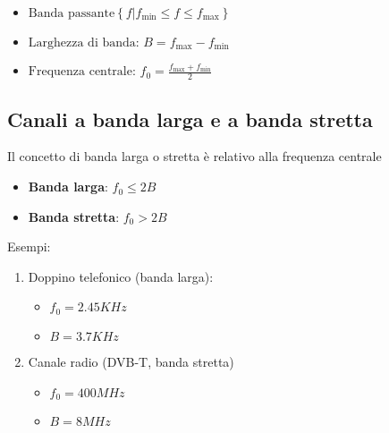 \begin{enumerate}
\begin{center}
          \end{center}

\end{enumerate}
\begin{itemize}
    \item $\text{Banda passante} \left\{ f \vert f_{\text{min}} \leq f \leq f_{\text{max}} \right\}$
    \item $\text{Larghezza di banda: } B = f_{\text{max}} - f_{\text{min}} $
    \item $\text{Frequenza centrale: } f_0 = \frac{f_{\text{max}} + f_{\text{min}}}{2}$
\end{itemize}



\subsection*{Canali a banda larga e a banda stretta}
Il concetto di banda larga o stretta è relativo alla frequenza centrale
\begin{itemize}
    \item \textbf{Banda larga}: $f_0 \leq 2B$
    \item \textbf{Banda stretta}: $f_0 > 2B$
\end{itemize}


Esempi:
\begin{enumerate}
    \item Doppino telefonico (banda larga):
          \begin{itemize}
              \item $f_0 = 2.45 KHz$
              \item $B = 3.7 KHz$
          \end{itemize}
    \item Canale radio (DVB-T, banda stretta)
          \begin{itemize}
              \item $f_0 = 400 MHz$
              \item $B = 8 MHz$
          \end{itemize}
\end{enumerate}

